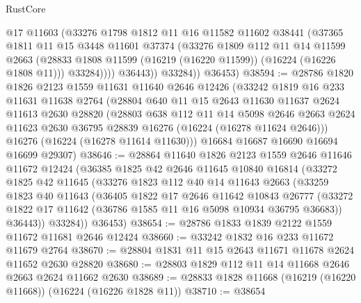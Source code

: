 \begin{lexlean}{RustCore}
\begin{coremodule}
                @17
                @11603
                (@33276
                  @1798
                  @1812
                  @11
                  @16
                  @11582
                  @11602
                  @38441
                  (@37365
                    @1811
                    @11
                    @15
                    @3448
                    @11601
                    @37374
                    (@33276
                      @1809
                      @112
                      @11
                      @14
                      @11599
                      @2663
                      (@28833 @1808 @11599 (@16219 (@16220 @11599)) (@16224 (@16226 @1808 @11)))
                      @33284))))
              @36443))
          @33284))
      @36453)
@38594 := @28786
    @1820
    @1826
    @2123
    @1559
    @11631
    @11640
    @2646
    @12426
    (@33242
      @1819
      @16
      @233
      @11631
      @11638
      @2764
      (@28804
        @640
        @11
        @15
        @2643
        @11630
        @11637
        @2624
        @11613
        @2630
        @28820
        (@28803
          @638
          @112
          @11
          @14
          @5098
          @2646
          @2663
          @2624
          @11623
          @2630
          @36795
          @28839
          @16276
          (@16224 (@16278 @11624 @2646)))
        @16276
        (@16224 (@16278 @11614 @11630)))
      @16684
      @16687
      @16690
      @16694
      @16699
      @29307)
@38646 := @28864
    @11640
    @1826
    @2123
    @1559
    @2646
    @11646
    @11672
    @12424
    (@36385
      @1825
      @42
      @2646
      @11645
      @10840
      @16814
      (@33272
        @1825
        @42
        @11645
        (@33276
          @1823
          @112
          @40
          @14
          @11643
          @2663
          (@33259
            @1823
            @40
            @11643
            (@36405
              @1822
              @17
              @2646
              @11642
              @10843
              @26777
              (@33272 @1822 @17 @11642 (@36786 @1585 @11 @16 @5098 @10934 @36795 @36683))
              @36443))
          @33284))
      @36453)
@38654 := @28786 @1833 @1839 @2122 @1559 @11672 @11681 @2646 @12424
@38660 := @33242 @1832 @16 @233 @11672 @11679 @2764
@38670 := @28804 @1831 @11 @15 @2643 @11671 @11678 @2624 @11652 @2630 @28820
@38680 := @28803 @1829 @112 @11 @14 @11668 @2646 @2663 @2624 @11662 @2630
@38689 := @28833 @1828 @11668 (@16219 (@16220 @11668)) (@16224 (@16226 @1828 @11))
@38710 := @38654

\end{coremodule}
\end{lexlean}
